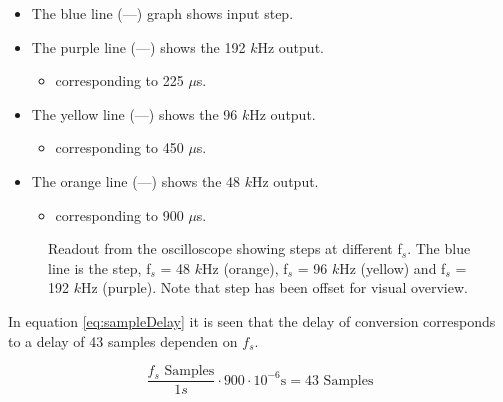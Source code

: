 \begin{itemize}
	\item The blue line (\textcolor{MATLABblue}{---}) graph shows input step.
	\item The purple line (\textcolor{MATLABpurple}{---}) shows the 192 $k$Hz output.
	\begin{itemize}
		\item corresponding to 225 $\mu$s.
	\end{itemize}
	\item The yellow line (\textcolor{MATLAByellow}{---}) shows the 96 $k$Hz output.
	\begin{itemize}
		\item corresponding to 450 $\mu$s.
	\end{itemize}
	\item The orange line (\textcolor{MATLABorange}{---}) shows the 48 $k$Hz output.
	\begin{itemize}
		\item corresponding to 900 $\mu$s.
	\end{itemize}
\end{itemize}
 

\begin{figure}[H]
	\centering
	
	\caption{Readout from the oscilloscope showing steps at different f$_s$. The blue line is the step, f$_s$ = 48 $k$Hz (orange), f$_s$ = 96 $k$Hz (yellow) and f$_s$ = 192 $k$Hz (purple). Note that step has been offset for visual overview.}
	\label{fig:ScopeDelayExperiment}
\end{figure}

In equation \ref{eq:sampleDelay} it is seen that the delay of conversion corresponds to a delay of 43 samples dependen on $f_s$.

\begin{equation}\label{eq:sampleDelay}
	\frac{f_s\text{ Samples}}{1s} \cdot 900\cdot 10^{-6}\text{s} = 43 \text{ Samples} 
\end{equation}






